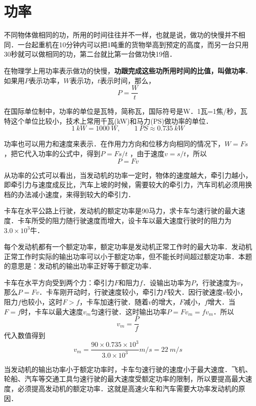 \section{功率}

不同物体做相同的功，所用的时间往往并不一样，也就是说，做功的快慢并不相同．一台起重机在10分钟内可以把1吨重的货物举高到预定的高度，而另一台只用30秒就可以做相同的功，第二台就比第一台做功快19倍．

在物理学上用功率表示做功的快慢，\textbf{功跟完成这些功所用时间的比值，叫做功率}．如果用$P$表示功率，$W$表示功，$t$表示时间，那么，
\[P=\frac{W}{t}\]

在国际单位制中，功率的单位是瓦特，简称瓦，国际符号是W．1瓦=1焦/秒，瓦特这个单位比较小，技术上常用千瓦(kW)和马力(PS)做功率的单位．
\[\qty{1}{kW}=\qty{1000}{W},\qquad \qty{1}{PS}\approx \qty{0.735}{kW}\]

功率也可以用力和速度来表示．在作用力方向和位移方向相同的情况下，$W=Fs$，把它代入功率的公式中，得到$P=Fs/t$
，由于速度$v=s/t$，所以
\[P=Fv \]

从功率的公式可以看出，当发动机的功率一定时，物体的速度越大，牵引力越小，即牵引力与速度成反比，汽车上坡的时候，需要较大的牵引力，汽车司机必须用换档的办法减小速度，来得到较大的牵引力．

\begin{example}
    卡车在水平公路上行驶，发动机的额定功率是90马力，求卡车匀速行驶的最大速度．卡车所受的阻力随行驶速度而增大，设卡车以最大速度行驶时的阻力为$3.0\times 10^3$牛．
\end{example}

\begin{solution}
    每个发动机都有一个额定功率，额定功率是发动机正常工作时的最大功率．发动机正常工作时实际的输出功率可以小于额定功率，但不能长时间超过额定功率．本题的意思是：发动机的输出功率正好等于额定功率．

    卡车在水平方向受到两个力：牵引力$F$和阻力$f$．设输出功率为$P$，行驶速度为$v$，那么$P=Fv$．卡车刚开动时，行驶速度较小，牵引力$F$较大．因行驶速度$v$较小，阻力$f$也较小，这时$F>f$，卡车加速行驶．随着$v$的增大，$F$减小，$f$增大．当$F=f$时，卡车以最大速度$v_m$匀速行驶．这时输出功率$P=Fv_m=fv_m$．所以
    \[v_m=\frac{P}{f}\]
    代入数值得到
    \[v_m=\frac{90\times 0.735\times 10^3}{3.0\times 10^3}{\si{m/s}}=\qty{22}{m/s} \]

    当发动机的输出功率小于额定功率时，卡车匀速行驶的速度小于最大速度．飞机、轮船、汽车等交通工具匀速行驶的最大速度受额定功率的限制，所以要提高最大速度，必须提高发动机的额定功率．这就是高速火车和汽车需要大功率发动机的原因．
\end{solution}

